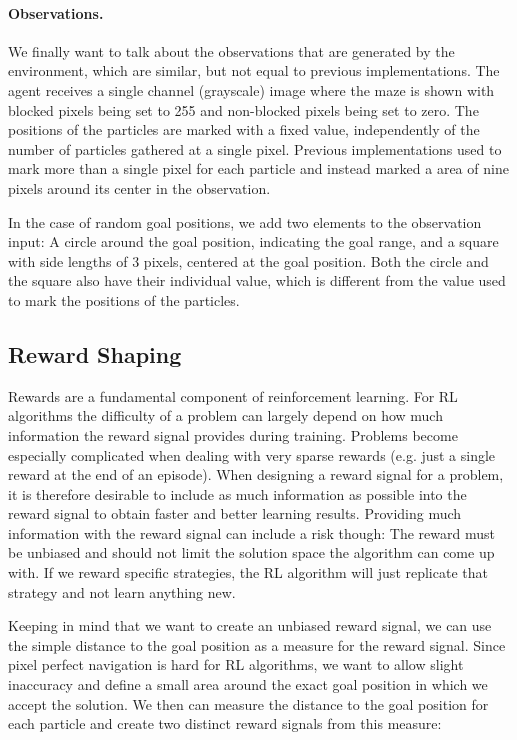 \paragraph{Observations. }
We finally want to talk about the observations that are generated by the environment, which are similar, but not equal to previous implementations. The agent receives a single channel (grayscale) image where the maze is shown with blocked pixels being set to 255 and non-blocked pixels being set to zero. The positions of the particles are marked with a fixed value, independently of the number of particles gathered at a single pixel. Previous implementations used to mark more than a single pixel for each particle and instead marked a area of nine pixels around its center in the observation. 

In the case of random goal positions, we add two elements to the observation input: A circle around the goal position, indicating the goal range, and a square with side lengths of 3 pixels, centered at the goal position. Both the circle and the square also have their individual value, which is different from the value used to mark the positions of the particles. 

\subsection{Reward Shaping} \label{sec:MazeReward}
Rewards are a fundamental component of reinforcement learning. For RL algorithms the difficulty of a problem can largely depend on how much information the reward signal provides during training. Problems become especially complicated when dealing with very sparse rewards (e.g. just a single reward at the end of an episode). When designing a reward signal for a problem, it is therefore desirable to include as much information as possible into the reward signal to obtain faster and better learning results. Providing much information with the reward signal can include a risk though: The reward must be unbiased and should not limit the solution space the algorithm can come up with. If we reward specific strategies, the RL algorithm will just replicate that strategy and not learn anything new.

Keeping in mind that we want to create an unbiased reward signal, we can use the simple distance to the goal position as a measure for the reward signal. Since pixel perfect navigation is hard for RL algorithms, we want to allow slight inaccuracy and define a small area around the exact goal position in which we accept the solution. We then can measure the distance to the goal position for each particle and create two distinct reward signals from this measure:

